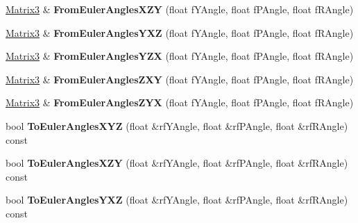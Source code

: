 \begin{DoxyCompactItemize}
\item 
\hyperlink{class_magnum_1_1_matrix3}{Matrix3} \& {\bfseries From\+Euler\+Angles\+X\+ZY} (float f\+Y\+Angle, float f\+P\+Angle, float f\+R\+Angle)\hypertarget{class_magnum_1_1_matrix3_ae2d6ddc3ff7912c896801e4552c10318}{}\label{class_magnum_1_1_matrix3_ae2d6ddc3ff7912c896801e4552c10318}

\item 
\hyperlink{class_magnum_1_1_matrix3}{Matrix3} \& {\bfseries From\+Euler\+Angles\+Y\+XZ} (float f\+Y\+Angle, float f\+P\+Angle, float f\+R\+Angle)\hypertarget{class_magnum_1_1_matrix3_a2f0c617823bb2c126bd868d6e143ae42}{}\label{class_magnum_1_1_matrix3_a2f0c617823bb2c126bd868d6e143ae42}

\item 
\hyperlink{class_magnum_1_1_matrix3}{Matrix3} \& {\bfseries From\+Euler\+Angles\+Y\+ZX} (float f\+Y\+Angle, float f\+P\+Angle, float f\+R\+Angle)\hypertarget{class_magnum_1_1_matrix3_ae2f084f022de248b1c2ca1e8cf4ae11b}{}\label{class_magnum_1_1_matrix3_ae2f084f022de248b1c2ca1e8cf4ae11b}

\item 
\hyperlink{class_magnum_1_1_matrix3}{Matrix3} \& {\bfseries From\+Euler\+Angles\+Z\+XY} (float f\+Y\+Angle, float f\+P\+Angle, float f\+R\+Angle)\hypertarget{class_magnum_1_1_matrix3_a8f55d7dc305ae6313b17ffcb99938931}{}\label{class_magnum_1_1_matrix3_a8f55d7dc305ae6313b17ffcb99938931}

\item 
\hyperlink{class_magnum_1_1_matrix3}{Matrix3} \& {\bfseries From\+Euler\+Angles\+Z\+YX} (float f\+Y\+Angle, float f\+P\+Angle, float f\+R\+Angle)\hypertarget{class_magnum_1_1_matrix3_ae5c499f1e5800a068fe8d0995352ab72}{}\label{class_magnum_1_1_matrix3_ae5c499f1e5800a068fe8d0995352ab72}

\item 
bool {\bfseries To\+Euler\+Angles\+X\+YZ} (float \&rf\+Y\+Angle, float \&rf\+P\+Angle, float \&rf\+R\+Angle) const \hypertarget{class_magnum_1_1_matrix3_a3e2cc89f38d0509a97b73458ec9c7c80}{}\label{class_magnum_1_1_matrix3_a3e2cc89f38d0509a97b73458ec9c7c80}

\item 
bool {\bfseries To\+Euler\+Angles\+X\+ZY} (float \&rf\+Y\+Angle, float \&rf\+P\+Angle, float \&rf\+R\+Angle) const \hypertarget{class_magnum_1_1_matrix3_afce2231f029136578bc5953db2ed57b0}{}\label{class_magnum_1_1_matrix3_afce2231f029136578bc5953db2ed57b0}

\item 
bool {\bfseries To\+Euler\+Angles\+Y\+XZ} (float \&rf\+Y\+Angle, float \&rf\+P\+Angle, float \&rf\+R\+Angle) const \hypertarget{class_magnum_1_1_matrix3_aaeda9c614e975c4b35968d2a68da405b}{}\label{class_magnum_1_1_matrix3_aaeda9c614e975c4b35968d2a68da405b}


\end{DoxyCompactItemize}
